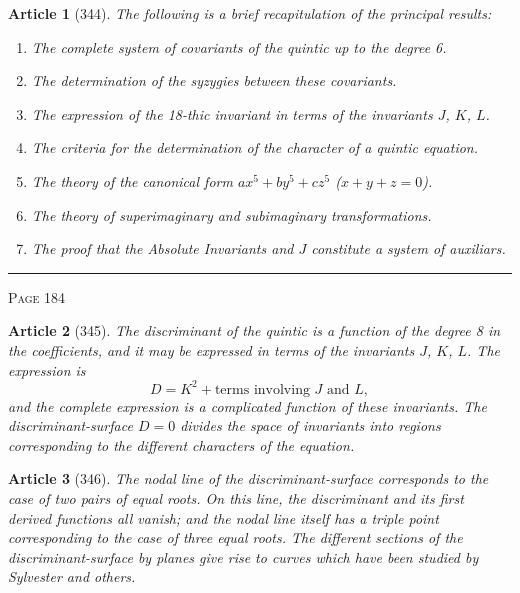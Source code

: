 \documentclass[11pt,a4paper]{article}
\theoremstyle{cayley}
\newtheorem{art}{Article}
\begin{document}
\begin{art}[344]
The following is a brief recapitulation of the principal results:
\begin{enumerate}[label=\arabic*.,itemsep=2pt]
\item The complete system of covariants of the quintic up to the degree 6.
\item The determination of the syzygies between these covariants.
\item The expression of the 18-thic invariant in terms of the invariants $J$, $K$, $L$.
\item The criteria for the determination of the character of a quintic equation.
\item The theory of the canonical form $ax^5 + by^5 + cz^5$ ($x+y+z=0$).
\item The theory of superimaginary and subimaginary transformations.
\item The proof that the Absolute Invariants and $J$ constitute a system of auxiliars.
\end{enumerate}
\end{art}

\vspace{1em}
\noindent\rule{\textwidth}{0.4pt}
\begin{center}\textsc{Page 184}\end{center}
\newpage

\begin{art}[345]
The discriminant of the quintic is a function of the degree 8 in the coefficients, and it may be expressed in terms of the invariants $J$, $K$, $L$. The expression is
\[
D = K^2 + \text{terms involving } J \text{ and } L,
\]
and the complete expression is a complicated function of these invariants. The discriminant-surface $D=0$ divides the space of invariants into regions corresponding to the different characters of the equation.
\end{art}

\begin{art}[346]
The nodal line of the discriminant-surface corresponds to the case of two pairs of equal roots. On this line, the discriminant and its first derived functions all vanish; and the nodal line itself has a triple point corresponding to the case of three equal roots. The different sections of the discriminant-surface by planes give rise to curves which have been studied by Sylvester and others.
\end{art}
\end{document}
